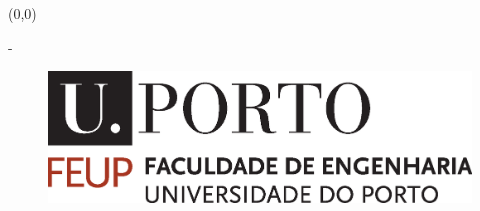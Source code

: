 \thispagestyle{empty}


\begin{textblock}{2}(0,0)%
	\rule{0mm}{30cm}
\end{textblock}


{\color{white} - }
\vfill

\begin{figure}[ht!]
	\begin{addmargin}[2cm]{1mm}
		\begin{center}
			\includegraphics[scale=0.45]{figures/0.Title/FEUP.eps}
		\end{center}
	\end{addmargin}
	
\end{figure}


